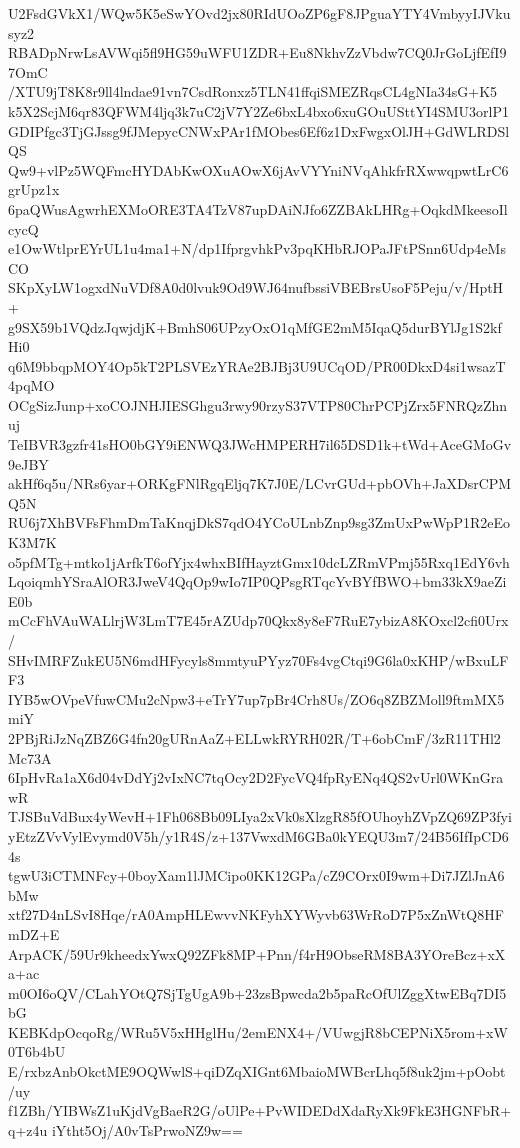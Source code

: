 U2FsdGVkX1/WQw5K5eSwYOvd2jx80RIdUOoZP6gF8JPguaYTY4VmbyyIJVkusyz2
RBADpNrwLsAVWqi5fl9HG59uWFU1ZDR+Eu8NkhvZzVbdw7CQ0JrGoLjfEfI97OmC
/XTU9jT8K8r9ll4lndae91vn7CsdRonxz5TLN41ffqiSMEZRqsCL4gNIa34sG+K5
k5X2ScjM6qr83QFWM4ljq3k7uC2jV7Y2Ze6bxL4bxo6xuGOuUSttYI4SMU3orlP1
GDIPfgc3TjGJssg9fJMepycCNWxPAr1fMObes6Ef6z1DxFwgxOlJH+GdWLRDSlQS
Qw9+vlPz5WQFmcHYDAbKwOXuAOwX6jAvVYYniNVqAhkfrRXwwqpwtLrC6grUpz1x
6paQWusAgwrhEXMoORE3TA4TzV87upDAiNJfo6ZZBAkLHRg+OqkdMkeesoIlcycQ
e1OwWtlprEYrUL1u4ma1+N/dp1IfprgvhkPv3pqKHbRJOPaJFtPSnn6Udp4eMsCO
SKpXyLW1ogxdNuVDf8A0d0lvuk9Od9WJ64nufbssiVBEBrsUsoF5Peju/v/HptH+
g9SX59b1VQdzJqwjdjK+BmhS06UPzyOxO1qMfGE2mM5IqaQ5durBYlJg1S2kfHi0
q6M9bbqpMOY4Op5kT2PLSVEzYRAe2BJBj3U9UCqOD/PR00DkxD4si1wsazT4pqMO
OCgSizJunp+xoCOJNHJIESGhgu3rwy90rzyS37VTP80ChrPCPjZrx5FNRQzZhnuj
TeIBVR3gzfr41sHO0bGY9iENWQ3JWcHMPERH7il65DSD1k+tWd+AceGMoGv9eJBY
akHf6q5u/NRs6yar+ORKgFNlRgqEljq7K7J0E/LCvrGUd+pbOVh+JaXDsrCPMQ5N
RU6j7XhBVFsFhmDmTaKnqjDkS7qdO4YCoULnbZnp9sg3ZmUxPwWpP1R2eEoK3M7K
o5pfMTg+mtko1jArfkT6ofYjx4whxBIfHayztGmx10dcLZRmVPmj55Rxq1EdY6vh
LqoiqmhYSraAlOR3JweV4QqOp9wIo7IP0QPsgRTqcYvBYfBWO+bm33kX9aeZiE0b
mCcFhVAuWALlrjW3LmT7E45rAZUdp70Qkx8y8eF7RuE7ybizA8KOxcl2cfi0Urx/
SHvIMRFZukEU5N6mdHFycyls8mmtyuPYyz70Fs4vgCtqi9G6la0xKHP/wBxuLFF3
IYB5wOVpeVfuwCMu2cNpw3+eTrY7up7pBr4Crh8Us/ZO6q8ZBZMoll9ftmMX5miY
2PBjRiJzNqZBZ6G4fn20gURnAaZ+ELLwkRYRH02R/T+6obCmF/3zR11THl2Mc73A
6IpHvRa1aX6d04vDdYj2vIxNC7tqOcy2D2FycVQ4fpRyENq4QS2vUrl0WKnGrawR
TJSBuVdBux4yWevH+1Fh068Bb09LIya2xVk0sXlzgR85fOUhoyhZVpZQ69ZP3fyi
yEtzZVvVylEvymd0V5h/y1R4S/z+137VwxdM6GBa0kYEQU3m7/24B56IfIpCD64s
tgwU3iCTMNFcy+0boyXam1lJMCipo0KK12GPa/cZ9COrx0I9wm+Di7JZlJnA6bMw
xtf27D4nLSvI8Hqe/rA0AmpHLEwvvNKFyhXYWyvb63WrRoD7P5xZnWtQ8HFmDZ+E
ArpACK/59Ur9kheedxYwxQ92ZFk8MP+Pnn/f4rH9ObseRM8BA3YOreBcz+xXa+ac
m0OI6oQV/CLahYOtQ7SjTgUgA9b+23zsBpwcda2b5paRcOfUlZggXtwEBq7DI5bG
KEBKdpOcqoRg/WRu5V5xHHglHu/2emENX4+/VUwgjR8bCEPNiX5rom+xW0T6b4bU
E/rxbzAnbOkctME9OQWwlS+qiDZqXIGnt6MbaioMWBcrLhq5f8uk2jm+pOobt/uy
f1ZBh/YIBWsZ1uKjdVgBaeR2G/oUlPe+PvWIDEDdXdaRyXk9FkE3HGNFbR+q+z4u
iYtht5Oj/A0vTsPrwoNZ9w==
